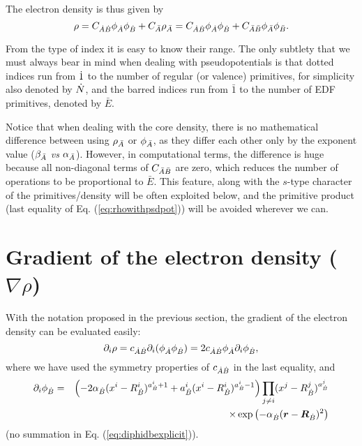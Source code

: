 The electron density is thus given by
%
\begin{equation}\label{eq:rhowithpsdpot}
  \rho=C_{\dot{A}\dot{B}}\phi_{\dot{A}}\phi_{\dot{B}}+C_{\bar{A}}\rho_{\bar{A}}
      =C_{\dot{A}\dot{B}}\phi_{\dot{A}}\phi_{\dot{B}}+C_{\bar{A}\bar{B}}\phi_{\bar{A}}\phi_{\bar{B}}.
\end{equation}
%

From the type of index it is easy to know their range. The only
subtlety that we must always bear in mind when dealing with pseudopotentials is that
dotted indices run from $\dot{1}$ to the number of regular (or valence) primitives,
for simplicity also denoted by $\dot{N}$,
and the barred indices run from $\bar 1$ to the number of EDF primitives,
denoted by $\bar E$.

Notice that when dealing with the core density, there is no mathematical
difference between using $\rho_{\bar{A}}$ or $\phi_{\bar{A}}$, as they differ each
other only by the exponent value ($\beta_{\bar{A}}$ \textit{vs} $\alpha_{\bar{A}}$).
However, in computational terms, the difference is huge because all
non-diagonal terms of $C_{\bar{A}\bar{B}}$ are zero, which reduces the number
of operations to be proportional to $\bar E$. This feature, along with the
$s$-type character of the primitives/density will be often
exploited below, and the primitive product (last equality of Eq.
(\ref{eq:rhowithpsdpot})) will be avoided wherever we can.



\section{Gradient of the electron density ($\nabla\rho$)}\label{sec:gradrho}

With the notation proposed in the previous section, the gradient of the electron density can be evaluated easily:
%
\begin{equation}
   \partial_i\rho=c_{\dot{A}\dot{B}}\partial_i(\phi_{\dot{A}}\phi_{\dot{B}})=2c_{\dot{A}\dot{B}}\phi_{\dot{A}}\partial_i\phi_{\dot{B}},
\end{equation}
%
where we have used the symmetry properties of $c_{\dot{A}\dot{B}}$ in the last equality, and
%
\begin{eqnarray}
   \partial_i\phi_{\dot{B}}&=&\left(-2\alpha_{\dot{B}}(x^i-R^i_{\dot{B}})^{a^i_{\dot{B}}+1}+
   a^i_{\dot{B}}(x^i-R^i_{\dot{B}})^{a^i_{\dot{B}}-1}\right)\prod_{j\neq i}(x^j-R^j_{\dot{B}})^{a^j_{\dot{B}}}\nonumber\\
                       & &\times\exp\left(-\alpha_{\dot{B}}(\boldsymbol{r}-\boldsymbol{R}_{\dot{B}})^2\right)
                       \label{eq:diphidbexplicit}
\end{eqnarray}
%
(no summation in Eq. (\ref{eq:diphidbexplicit})).

